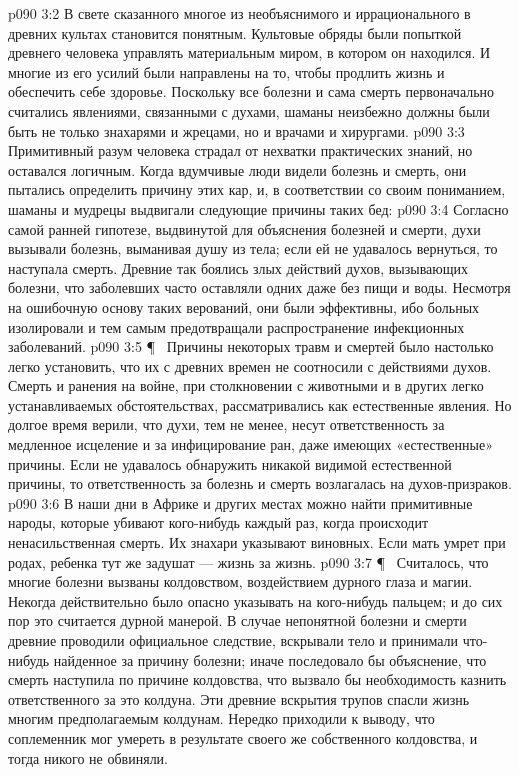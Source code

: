 \vs p090 3:2 В свете сказанного многое из необъяснимого и иррационального в древних культах становится понятным. Культовые обряды были попыткой древнего человека управлять материальным миром, в котором он находился. И многие из его усилий были направлены на то, чтобы продлить жизнь и обеспечить себе здоровье. Поскольку все болезни и сама смерть первоначально считались явлениями, связанными с духами, шаманы неизбежно должны были быть не только знахарями и жрецами, но и врачами и хирургами.
\vs p090 3:3 Примитивный разум человека страдал от нехватки практических знаний, но оставался логичным. Когда вдумчивые люди видели болезнь и смерть, они пытались определить причину этих кар, и, в соответствии со своим пониманием, шаманы и мудрецы выдвигали следующие причины таких бед:
\vs p090 3:4 \bibnobreakspace {} Согласно самой ранней гипотезе, выдвинутой для объяснения болезней и смерти, духи вызывали болезнь, выманивая душу из тела; если ей не удавалось вернуться, то наступала смерть. Древние так боялись злых действий духов, вызывающих болезни, что заболевших часто оставляли одних даже без пищи и воды. Несмотря на ошибочную основу таких верований, они были эффективны, ибо больных изолировали и тем самым предотвращали распространение инфекционных заболеваний.
\vs p090 3:5 \P\ \bibnobreakspace {} Причины некоторых травм и смертей было настолько легко установить, что их с древних времен не соотносили с действиями духов. Смерть и ранения на войне, при столкновении с животными и в других легко устанавливаемых обстоятельствах, рассматривались как естественные явления. Но долгое время верили, что духи, тем не менее, несут ответственность за медленное исцеление и за инфицирование ран, даже имеющих «естественные» причины. Если не удавалось обнаружить никакой видимой естественной причины, то ответственность за болезнь и смерть возлагалась на духов\hyp{}призраков.
\vs p090 3:6 В наши дни в Африке и других местах можно найти примитивные народы, которые убивают кого\hyp{}нибудь каждый раз, когда происходит ненасильственная смерть. Их знахари указывают виновных. Если мать умрет при родах, ребенка тут же задушат --- жизнь за жизнь.
\vs p090 3:7 \P\ \bibnobreakspace {} Считалось, что многие болезни вызваны колдовством, воздействием дурного глаза и магии. Некогда действительно было опасно указывать на кого\hyp{}нибудь пальцем; и до сих пор это считается дурной манерой. В случае непонятной болезни и смерти древние проводили официальное следствие, вскрывали тело и принимали что\hyp{}нибудь найденное за причину болезни; иначе последовало бы объяснение, что смерть наступила по причине колдовства, что вызвало бы необходимость казнить ответственного за это колдуна. Эти древние вскрытия трупов спасли жизнь многим предполагаемым колдунам. Нередко приходили к выводу, что соплеменник мог умереть в результате своего же собственного колдовства, и тогда никого не обвиняли.
